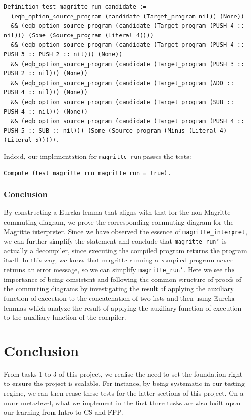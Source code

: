 \documentclass{article}
\begin{document}
\begin{lstlisting}
Definition test_magritte_run candidate :=
  (eqb_option_source_program (candidate (Target_program nil)) (None))
  && (eqb_option_source_program (candidate (Target_program (PUSH 4 :: nil))) (Some (Source_program (Literal 4))))
  && (eqb_option_source_program (candidate (Target_program (PUSH 4 :: PUSH 3 :: PUSH 2 :: nil))) (None))
  && (eqb_option_source_program (candidate (Target_program (PUSH 3 :: PUSH 2 :: nil))) (None))
  && (eqb_option_source_program (candidate (Target_program (ADD :: PUSH 4 :: nil))) (None))
  && (eqb_option_source_program (candidate (Target_program (SUB :: PUSH 4 :: nil))) (None))
  && (eqb_option_source_program (candidate (Target_program (PUSH 4 :: PUSH 5 :: SUB :: nil))) (Some (Source_program (Minus (Literal 4) (Literal 5))))).
\end{lstlisting}

Indeed, our implementation for \texttt{magritte\_run} passes the tests:

\begin{lstlisting}
Compute (test_magritte_run magritte_run = true).
\end{lstlisting}

\subsubsection{Conclusion}
By constructing a Eureka lemma that aligns with that for the non-Magritte commuting diagram, we prove the corresponding commuting diagram for the Magritte interpreter. Since we have observed the essence of \texttt{magritte\_interpret}, we can further simplify the statement and conclude that \texttt{magritte\_run'} is actually a decompiler, since executing the compiled program returns the program itself. In this way, we know that magritte-running a compiled program never returns an error message, so we can simplify \texttt{magritte\_run'}. Here we see the importance of being consistent and following the common structure of proofs of the commuting diagrams by investigating the result of applying the auxiliary function of execution to the concatenation of two lists and then using Eureka lemmas which analyze the result of applying the auxiliary function of execution to the auxiliary function of the compiler.

\section{Conclusion}
From tasks 1 to 3 of this project, we realise the need to set the foundation right to ensure the project is scalable. For instance, by being systematic in our testing regime, we can then reuse these tests for the latter sections of this project.  On a more meta-level, what we implement in the first three tasks are also built upon our learning from Intro to CS and FPP.
\end{document}
